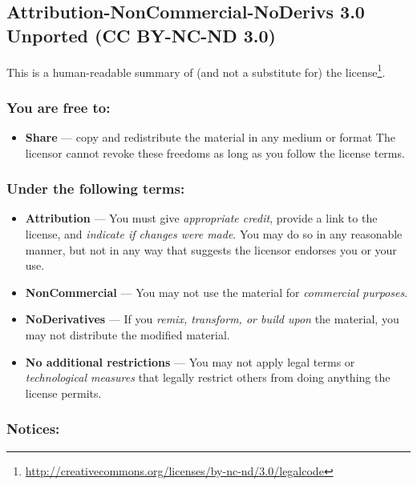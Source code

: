 
\subsection{Attribution-NonCommercial-NoDerivs 3.0 Unported (CC BY-NC-ND 3.0)}

This is a human-readable summary of (and not a substitute for) the
license\footnote{\url{http://creativecommons.org/licenses/by-nc-nd/3.0/legalcode}}.

\subsubsection{You are free to:}

\begin{itemize}
    \item \textbf{Share }--- copy and redistribute the material in any medium or format
    The licensor cannot revoke these freedoms as long as you follow the license
    terms.
\end{itemize}

\subsubsection{Under the following terms:}

\begin{itemize}
    \item \textbf{Attribution }--- You must give \emph{appropriate credit}, provide a
    link to the license, and \emph{indicate if changes were made}. You may do
    so in any reasonable manner, but not in any way that suggests the licensor
    endorses you or your use.  
    
    \item \textbf{NonCommercial }--- You may not use the material for \emph{commercial
    purposes}.
    
    \item \textbf{NoDerivatives }--- If you \emph{remix, transform, or build upon} the
    material, you may not distribute the modified material.
    
    \item \textbf{No additional restrictions }--- You may not apply legal terms or
    \emph{technological measures} that legally restrict others from doing
    anything the license permits.
\end{itemize}

\subsubsection{Notices:}

